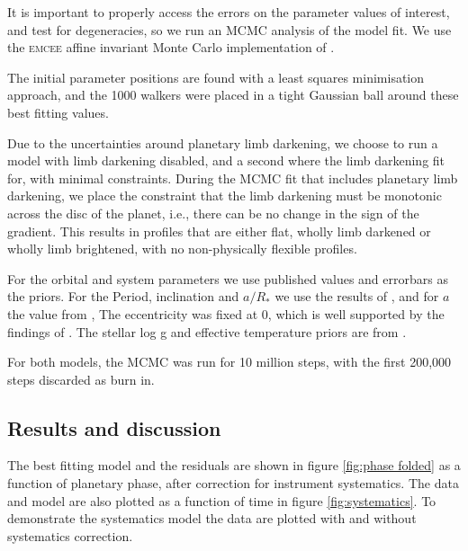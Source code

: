 \documentclass[a4paper,fleqn,usenatbib]{mnras}
\begin{document}
It is important to properly access the errors on the parameter values of interest, and test for degeneracies, so we run an MCMC analysis of the model fit. We use the \textsc{emcee} affine invariant Monte Carlo implementation of \citet{Foreman-Mackey2013}.

The initial parameter positions are found with a least squares minimisation approach, and the 1000 walkers were placed in a tight Gaussian ball around these best fitting values.

Due to the uncertainties around planetary limb darkening, we choose to run a model with limb darkening disabled, and a second where the limb darkening fit for, with minimal constraints. During the MCMC fit that includes planetary limb darkening, we place the constraint that the limb darkening must be monotonic across the disc of the planet, i.e., there can be no change in the sign of the gradient. This results in profiles that are either flat, wholly limb darkened or wholly limb brightened, with no non-physically flexible profiles.

For the orbital and system parameters we use published values and errorbars as the priors. For the Period, inclination and $a/R_*$ we use the results of \citet{Hoyer2016}, and for $a$ the value from \citet{Hellier2011a}, The eccentricity was fixed at 0, which is well supported by the findings of \citet{Hoyer2016}. The stellar log g and effective temperature priors are from \citet{Gillon2012}.

For both models, the MCMC was run for 10 million steps, with the first 200,000 steps discarded as burn in.

\subsection{Results and discussion}\label{sec:results}

The best fitting model and the residuals are shown in figure \ref{fig:phase folded} as a function of planetary phase, after correction for instrument systematics. The data and model are also plotted as a function of time in figure \ref{fig:systematics}. To demonstrate the systematics model the data are plotted with and without systematics correction.
\end{document}
